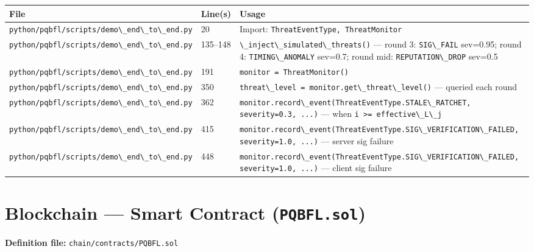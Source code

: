 \documentclass[11pt,a4paper]{article}
\newcommand{\code}[1]{\lstinline[basicstyle=\ttfamily\small]!#1!}
\begin{document}
\begin{longtable}{L{5.5cm} L{2cm} L{6.8cm}}
\toprule
\textbf{File} & \textbf{Line(s)} & \textbf{Usage} \\
\midrule
\endhead
\bottomrule
\endfoot
\code{python/pqbfl/scripts/demo\_end\_to\_end.py} & 20      & Import: \code{ThreatEventType, ThreatMonitor} \\
\code{python/pqbfl/scripts/demo\_end\_to\_end.py} & 135--148 & \code{\_inject\_simulated\_threats()} --- round 3: \code{SIG\_FAIL} sev=0.95; round 4: \code{TIMING\_ANOMALY} sev=0.7; round mid: \code{REPUTATION\_DROP} sev=0.5 \\
\code{python/pqbfl/scripts/demo\_end\_to\_end.py} & 191     & \code{monitor = ThreatMonitor()} \\
\code{python/pqbfl/scripts/demo\_end\_to\_end.py} & 350     & \code{threat\_level = monitor.get\_threat\_level()} --- queried each round \\
\code{python/pqbfl/scripts/demo\_end\_to\_end.py} & 362     & \code{monitor.record\_event(ThreatEventType.STALE\_RATCHET, severity=0.3, ...)} --- when \code{i >= effective\_L\_j} \\
\code{python/pqbfl/scripts/demo\_end\_to\_end.py} & 415     & \code{monitor.record\_event(ThreatEventType.SIG\_VERIFICATION\_FAILED, severity=1.0, ...)} --- server sig failure \\
\code{python/pqbfl/scripts/demo\_end\_to\_end.py} & 448     & \code{monitor.record\_event(ThreatEventType.SIG\_VERIFICATION\_FAILED, severity=1.0, ...)} --- client sig failure \\
\end{longtable}

\section{Blockchain --- Smart Contract (\texttt{PQBFL.sol})}

\textbf{Definition file:} \code{chain/contracts/PQBFL.sol}
\end{document}
